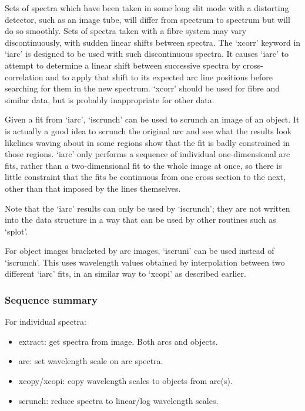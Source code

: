    Sets of spectra which have been taken in some long slit mode with a
   distorting detector, such as an image tube, will differ from spectrum
   to spectrum but will do so smoothly.  Sets of spectra taken with a
   fibre system may vary discontinuously, with sudden linear shifts
   between spectra.  The `xcorr' keyword in `iarc' is designed to be
   used with such discontinuous spectra.  It causes `iarc' to attempt to
   determine a linear shift between successive spectra by
   cross-correlation and to apply that shift to its expected arc line
   positions before searching for them in the new spectrum. `xcorr'
   should be used for fibre and similar data, but is probably
   inappropriate for other data.

   Given a fit from `iarc', `iscrunch' can be used to scrunch an image
   of an object. It is actually a good idea to scrunch the original arc
   and see what the results look like\latorhtm{---}{-}lines waving about in
   some regions show that the fit is badly constrained in those regions.
   `iarc' only performs a sequence of individual one-dimensional arc
   fits, rather than a two-dimensional fit to the whole image at once,
   so there is little constraint that the fits be continuous from one
   cross section to the next, other than that imposed by the lines
   themselves.

   Note that the `iarc' results can only be used by `iscrunch'; they are
   not written into the data structure in a way that can be used by
   other routines such as `splot'.

   For object images bracketed by arc images, `iscruni' can be used
   instead of `iscrunch'.  This uses wavelength values obtained by
   interpolation between two different `iarc' fits, in an similar way to
   `xcopi' as described earlier.


\subsubsection{\label{techno8summary}Sequence summary}

   For individual spectra:

\begin{itemize}
\item
   extract:       get spectra from image.  Both arcs and objects.
\item
   arc:           set wavelength scale on arc spectra.
\item
   xcopy/xcopi:   copy wavelength scales to objects from arc(s).
\item
   scrunch:       reduce spectra to linear/log wavelength scales.
\end{itemize}

